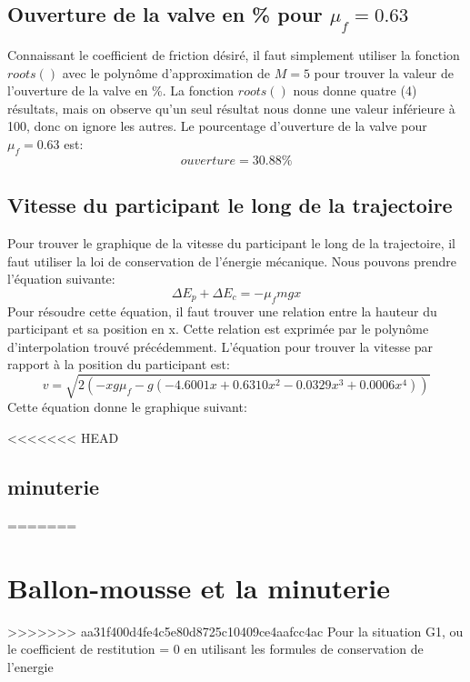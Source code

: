 \documentclass{article}
\begin{document}
\subsection{Ouverture de la valve en \% pour $\mu_f=0.63$}
Connaissant le coefficient de friction désiré, il faut simplement utiliser la fonction $roots()$ avec le polynôme d'approximation de $M=5$ pour trouver la valeur de l'ouverture de la valve en \%. La fonction $roots()$ nous donne quatre (4) résultats, mais on observe qu'un seul résultat nous donne une valeur inférieure à 100, donc on ignore les autres. Le pourcentage d'ouverture de la valve pour $\mu_f=0.63$ est:
\begin{equation}
	ouverture = 30.88\%
\end{equation}

\subsection{Vitesse du participant le long de la trajectoire}
Pour trouver le graphique de la vitesse du participant le long de la trajectoire, il faut utiliser la loi de conservation de l'énergie mécanique. Nous pouvons prendre l'équation suivante:
\begin{equation}
	\Delta E_p + \Delta E_c = -\mu_fmgx
\end{equation}
Pour résoudre cette équation, il faut trouver une relation entre la hauteur du participant et sa position en x. Cette relation est exprimée par le polynôme d'interpolation trouvé précédemment. L'équation pour trouver la vitesse par rapport à la position du participant est:
\begin{equation}
	v = \sqrt{2(-xg\mu_f-g(-4.6001x+0.6310x^2-0.0329x^3+0.0006x^4))}
\end{equation}
Cette équation donne le graphique suivant:
\begin{center}
\end{center}

<<<<<<< HEAD
 
 \subsection{minuterie}
=======
\section{Ballon-mousse et la minuterie}
>>>>>>> aa31f400d4fe4c5e80d8725c10409ce4aafcc4ac
 Pour la situation G1, ou le coefficient de restitution = 0
 en utilisant les formules de conservation de l'energie 
 
\end{document}
